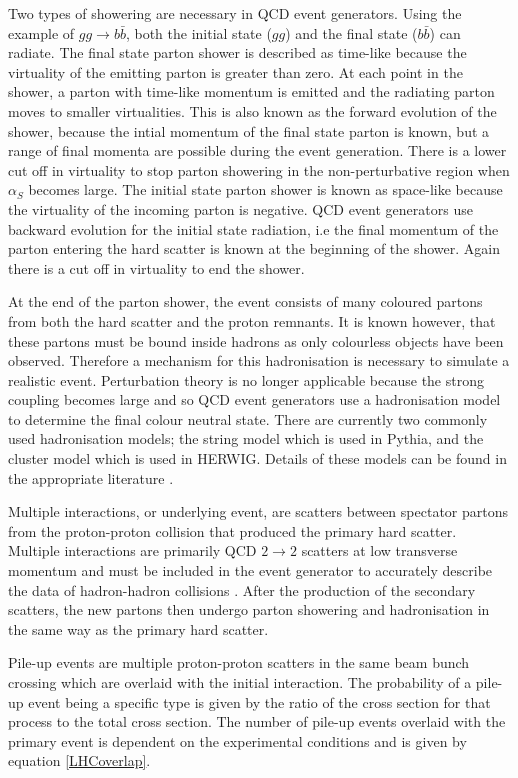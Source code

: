 Two types of showering are necessary in QCD event generators. Using the example of $gg \rightarrow b\bar{b}$, both the initial state ($gg$) and the final state ($b\bar{b}$) can radiate. The final state parton shower is described as time-like because the virtuality of the emitting parton is greater than zero. At each point in the shower, a parton with time-like momentum is emitted and the radiating parton moves to smaller virtualities. This is also known as the forward evolution of the shower, because the intial  momentum of the final state parton is known, but a range of final momenta are possible during the event generation. There is a lower cut off in virtuality to stop parton showering in the non-perturbative region when $\alpha_S$ becomes large. The initial state parton shower is known as space-like because the virtuality of the incoming parton is negative. QCD event generators use backward evolution for the initial state radiation, i.e the final momentum of the parton entering the hard scatter is known at the beginning of the shower. Again there is a cut off in virtuality to end the shower.

At the end of the parton shower, the event consists of many coloured partons from both the hard scatter and the proton remnants. It is known however, that these partons must be bound inside hadrons as only colourless objects have been observed. Therefore a mechanism for this hadronisation is necessary to simulate a realistic event. Perturbation theory is no longer applicable because the strong coupling becomes large and so QCD event generators use a hadronisation model to determine the final colour neutral state. There are currently two commonly used hadronisation models; the string model which is used in Pythia, and the cluster model which is used in HERWIG. Details of these models can be found in the appropriate literature \cite{Corcella:2000bw,Sjostrand:2006za}.

Multiple interactions, or underlying event, are scatters between spectator partons from the proton-proton collision that produced the primary hard scatter. Multiple interactions are primarily  QCD $2\rightarrow 2$ scatters at low transverse momentum and must be included in the event generator to accurately describe the data of hadron-hadron collisions \cite{Alekhin:2005dx:MPITune}. After the production of the secondary scatters, the new partons then undergo parton showering and hadronisation in the same way as the primary hard scatter. 

Pile-up events are multiple proton-proton scatters in the same beam bunch crossing which are overlaid with the initial interaction. The probability of a pile-up event being a specific type is given by the ratio of the cross section for that process to the total cross section. The number of pile-up events overlaid with the primary event is dependent on the experimental conditions and is given by equation \ref{LHCoverlap}.

